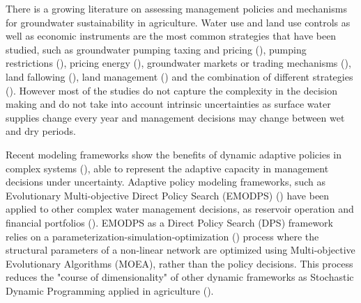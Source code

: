 \documentclass[11pt,a4paper]{article}
\begin{document}
There is a growing literature on assessing management policies and mechanisms for groundwater sustainability in agriculture. Water use and land use controls as well as economic instruments are the most common strategies that have been studied, such as groundwater pumping taxing and pricing (\cite{madani_exogenous_2013,mulligan_assessing_2014,stone_economic_2022}), pumping restrictions (\cite{young_hydrologic-economic_2021,lan_performance_2021,macewan_hydroeconomic_2017,rodriguez-flores_global_2022}), pricing energy (\cite{hrozencik_impacts_2022}), groundwater markets or trading mechanisms (\cite{khan_effect_2019,kuwayama_regulation_2013}), land fallowing (\cite{van_schmidt_linkages_2022}), land management (\cite{bourque_balancing_2019,li_evaluation_2018,bryant_shaping_2020}) and the combination of different strategies (\cite{graveline_combining_2019,hrozencik_heterogeneous_2017}). However most of the studies do not capture the complexity in the decision making  and do not take into account intrinsic uncertainties as surface water supplies change every year and management decisions may change between wet and dry periods. 

Recent modeling frameworks show the benefits of dynamic adaptive policies in complex systems (\cite{herman_climate_2020,walker_adapt_2013}), able to  represent the adaptive capacity in management decisions under uncertainty.  Adaptive policy modeling frameworks, such as Evolutionary Multi-objective Direct Policy Search (EMODPS) (\cite{giuliani_curses_2016,macian-sorribes_inferring_2019}) have been applied to other complex water management decisions, as reservoir operation and financial portfolios (\cite{zatarain_salazar_balancing_2017,gupta_can_2020}). EMODPS as a Direct Policy Search (DPS) framework relies on a parameterization-simulation-optimization (\cite{koutsoyiannis_evaluation_2003}) process where the structural parameters of a non-linear network are optimized using Multi-objective Evolutionary Algorithms (MOEA), rather than the policy decisions. This process reduces the "course of dimensionality" of other dynamic frameworks as Stochastic Dynamic Programming applied in agriculture (\cite{taylor_dynamic_1993}). 
\end{document}
